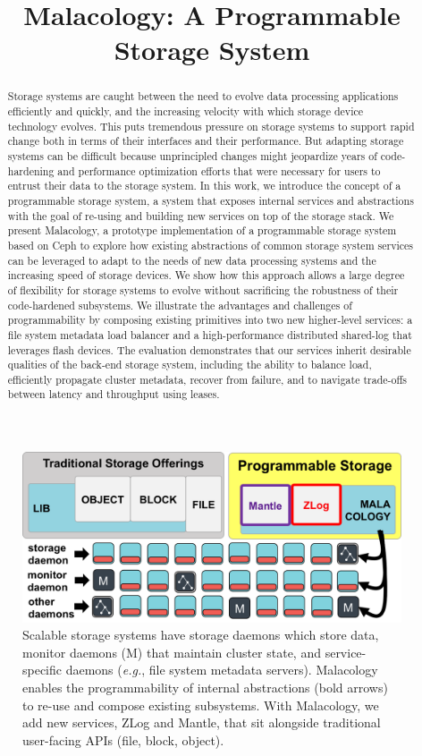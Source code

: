\documentclass[preprint]{sigplanconf-eurosys}
\title{Malacology: A Programmable Storage System}
\date{}
\begin{document}
\maketitle

\begin{abstract}
Storage systems are caught between the need to evolve data processing applications efficiently and quickly,
and the increasing velocity with which storage device technology evolves. This puts tremendous
pressure on storage systems to support rapid change both in terms of their
interfaces and their performance. But adapting storage systems can be difficult
because unprincipled changes might jeopardize years of code-hardening and
performance optimization efforts that were necessary for users to entrust their
data to the storage system. In this work, we introduce the concept of a programmable storage system, a system that exposes internal services and abstractions with the goal of re-using and building new services on top of the storage stack. We present Malacology, a prototype implementation of a programmable storage system based on Ceph
to explore how existing abstractions of common storage system services 
can be leveraged to 
adapt to the needs of
new data processing systems and the
increasing speed of storage devices. We show how this approach allows a large degree of
flexibility for storage systems to evolve without sacrificing the robustness of
their code-hardened subsystems. We illustrate the advantages and challenges of
programmability by composing existing primitives into two new higher-level
services: a file system metadata load balancer and a high-performance
distributed shared-log that leverages flash devices. The evaluation
demonstrates that our services inherit desirable qualities of the back-end
storage system, including the ability to balance load, efficiently propagate
cluster metadata, recover from failure, and to navigate trade-offs between
latency and throughput using leases.
\end{abstract}

\begin{figure}[tb]
\centering
\includegraphics{figures/overview.png}
\caption{Scalable storage systems have storage daemons which store data,
monitor daemons (M) that maintain cluster state, and service-specific daemons
({\it e.g.}, file system metadata servers). Malacology enables the programmability of
internal abstractions (bold arrows) to re-use and compose
existing subsystems.  With Malacology, we add new services, ZLog and
Mantle, that sit alongside traditional user-facing APIs (file, block,
object).}\label{fig:overview}
\end{figure}
\end{document}
